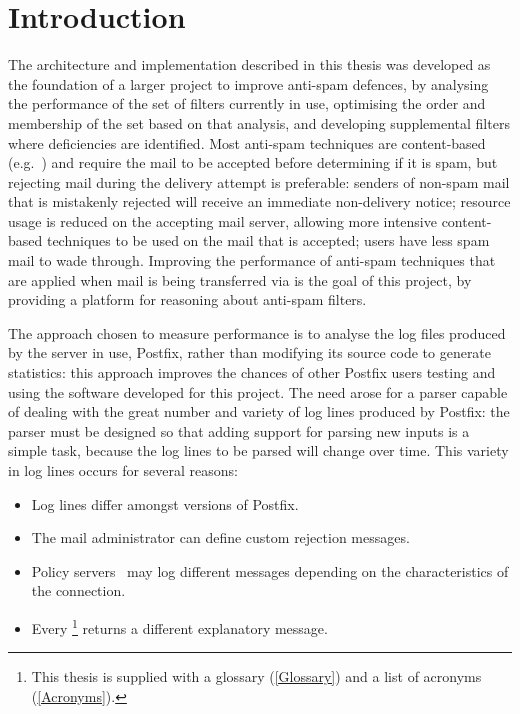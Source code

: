 \chapter{Introduction}

\label{introduction}

The architecture and implementation described in this thesis was developed
as the foundation of a larger project to improve anti-spam defences, by
analysing the performance of the set of filters currently in use,
optimising the order and membership of the set based on that analysis, and
developing supplemental filters where deficiencies are identified.  Most
anti-spam techniques are content-based (e.g.~\cite{a-plan-for-spam,
relaxed-online-svms, word-stemming}) and require the mail to be accepted
before determining if it is spam, but rejecting mail during the delivery
attempt is preferable: senders of non-spam mail that is mistakenly rejected
will receive an immediate non-delivery notice; resource usage is reduced on
the accepting mail server, allowing more intensive content-based techniques
to be used on the mail that is accepted; users have less spam mail to wade
through.  Improving the performance of anti-spam techniques that are
applied when mail is being transferred via  is the goal of
this project, by providing a platform for reasoning about anti-spam
filters.

The approach chosen to measure performance is to analyse the log files
produced by the  server in use, Postfix, rather than
modifying its source code to generate statistics: this approach improves
the chances of other Postfix users testing and using the software developed
for this project.  The need arose for a parser capable of dealing with the
great number and variety of log lines produced by Postfix: the parser must
be designed so that adding support for parsing new inputs is a simple task,
because the log lines to be parsed will change over time.  This variety in
log lines occurs for several reasons:

\begin{itemize}

    \squeezeitems{}

    \item Log lines differ amongst versions of Postfix.

    \item The mail administrator can define custom rejection messages.

    \item Policy servers~\cite{policy-servers} may log different messages
        depending on the characteristics of the connection.

    \item Every \footnote{This thesis is supplied with a
        glossary (\textsection\ref{Glossary}) and a list of acronyms
        (\textsection\ref{Acronyms}).} returns a different explanatory
        message.

\end{itemize}

